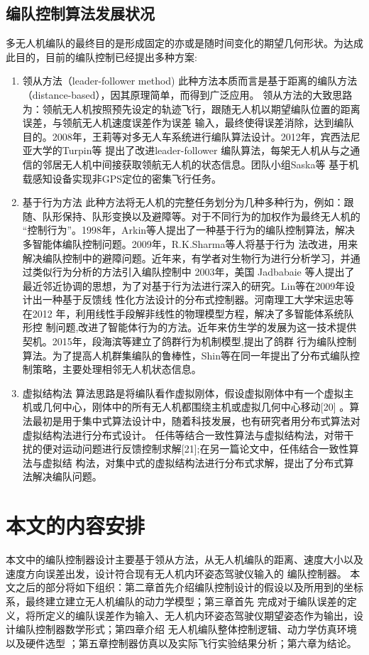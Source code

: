 \subsection{编队控制算法发展状况}
多无人机编队的最终目的是形成固定的亦或是随时间变化的期望几何形状。为达成此目的，目前的编队控制已经提出多种方案:
\begin{enumerate}
    \item 领从方法（leader-follower method) 此种方法本质而言是基于距离的编队方法（distance-based），因其原理简单，而得到广泛应用。
        领从方法的大致思路为：领航无人机按照预先设定的轨迹飞行，跟随无人机以期望编队位置的距离误差，与领航无人机速度误差作为误差
        输入，最终使得误差消除，达到编队目的。2008年，王莉等对多无人车系统进行编队算法设计。2012年，宾西法尼亚大学的Turpin等
        提出了改进leader-follower 编队算法，每架无人机从与之通信的邻居无人机中间接获取领航无人机的状态信息。团队小组Saska等
        基于机载感知设备实现非GPS定位的密集飞行任务。
    \item 基于行为方法
        此种方法将无人机的完整任务划分为几种多种行为，例如：跟随、队形保持、队形变换以及避障等。对于不同行为的加权作为最终无人机的
        “控制行为”。1998年，Arkin等人提出了一种基于行为的编队控制算法，解决多智能体编队控制问题。2009年，R.K.Sharma等人将基于行为
        法改进，用来解决编队控制中的避障问题。近年来，有学者对生物行为进行分析学习，并通过类似行为分析的方法引入编队控制中
        2003年，美国 Jadbabaie 等人提出了最近邻近协调的思想，为了对基于行为法进行深入的研究。Lin等在2009年设计出一种基于反馈线
        性化方法设计的分布式控制器。河南理工大学宋运忠等在2012 年，利用线性手段解非线性的物理模型方程，解决了多智能体系统队形控
        制问题,改进了智能体行为的方法。近年来仿生学的发展为这一技术提供契机。2015年，段海滨等建立了鸽群行为机制模型,提出了鸽群
        行为编队控制算法。为了提高人机群集编队的鲁棒性，Shin等在同一年提出了分布式编队控制策略，主要处理相邻无人机状态信息。
    \item 虚拟结构法
        算法思路是将编队看作虚拟刚体，假设虚拟刚体中有一个虚拟主机或几何中心，刚体中的所有无人机都围绕主机或虚拟几何中心移动[20]
        。算法最初是用于集中式算法设计中，随着科技发展，也有研究者用分布式算法对虚拟结构法进行分布式设计。
        任伟等结合一致性算法与虚拟结构法，对带干扰的便对运动问题进行反馈控制求解[21];在另一篇论文中，任伟结合一致性算法与虚拟结
        构法，对集中式的虚拟结构法进行分布式求解，提出了分布式算法解决编队问题。
\end{enumerate}
\section{本文的内容安排}
本文中的编队控制器设计主要基于领从方法，从无人机编队的距离、速度大小以及速度方向误差出发，设计符合现有无人机内环姿态驾驶仪输入的
编队控制器。
本文之后的部分将如下组织：第二章首先介绍编队控制设计的假设以及所用到的坐标系，最终建立建立无人机编队的动力学模型；第三章首先
完成对于编队误差的定义，将所定义的编队误差作为输入、无人机内环姿态驾驶仪期望姿态作为输出，设计编队控制器数学形式；第四章介绍
无人机编队整体控制逻辑、动力学仿真环境以及硬件选型 ；第五章控制器仿真以及实际飞行实验结果分析；第六章为结论。
